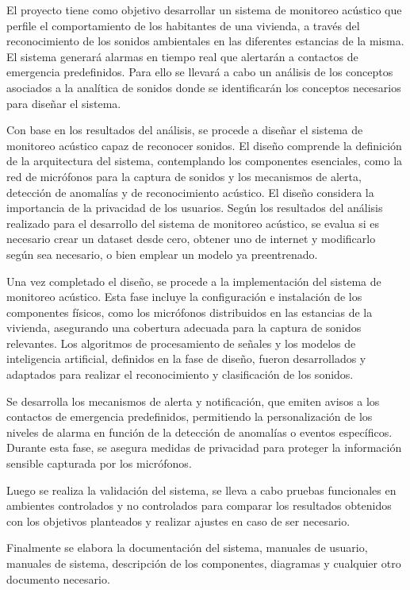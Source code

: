 
El proyecto tiene como objetivo desarrollar un sistema de monitoreo acústico que perfile el comportamiento de los habitantes de una vivienda, a través del reconocimiento de los sonidos ambientales en las diferentes estancias de la misma. El sistema generará alarmas en tiempo real que alertarán a contactos de emergencia predefinidos. Para ello se llevará a cabo un análisis de los conceptos asociados a la analítica de sonidos donde se identificarán los conceptos necesarios para diseñar el sistema.

Con base en los resultados del análisis, se procede a diseñar el sistema de monitoreo acústico capaz de reconocer sonidos. El diseño comprende la definición de la arquitectura del sistema, contemplando los componentes esenciales, como la red de micrófonos para la captura de sonidos y los mecanismos de alerta, detección de anomalías y de reconocimiento acústico. El diseño considera la importancia de la privacidad de los usuarios. Según los resultados del análisis realizado para el desarrollo del sistema de monitoreo acústico, se evalua si es necesario crear un dataset desde cero, obtener uno de internet y modificarlo según sea necesario, o bien emplear un modelo ya preentrenado.

Una vez completado el diseño, se procede a la implementación del sistema de monitoreo acústico. Esta fase incluye la configuración e instalación de los componentes físicos, como los micrófonos distribuidos en las estancias de la vivienda, asegurando una cobertura adecuada para la captura de sonidos relevantes. Los algoritmos de procesamiento de señales y los modelos de inteligencia artificial, definidos en la fase de diseño, fueron desarrollados y adaptados para realizar el reconocimiento y clasificación de los sonidos.

Se desarrolla los mecanismos de alerta y notificación, que emiten avisos a los contactos de emergencia predefinidos, permitiendo la personalización de los niveles de alarma en función de la detección de anomalías o eventos específicos. Durante esta fase, se asegura medidas de privacidad para proteger la información sensible capturada por los micrófonos.

Luego se realiza la validación del sistema, se lleva a cabo pruebas funcionales en ambientes controlados y no controlados para comparar los resultados obtenidos con los objetivos planteados y realizar ajustes en caso de ser necesario.

Finalmente se elabora la documentación del sistema, manuales de usuario, manuales de sistema, descripción de los componentes, diagramas y cualquier otro documento necesario.
